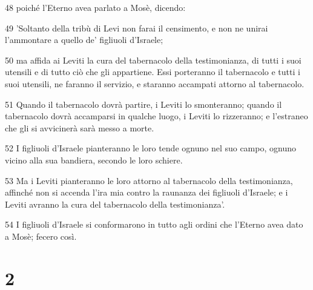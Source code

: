 \par 48 poiché l'Eterno avea parlato a Mosè, dicendo:
\par 49 'Soltanto della tribù di Levi non farai il censimento, e non ne unirai l'ammontare a quello de' figliuoli d'Israele;
\par 50 ma affida ai Leviti la cura del tabernacolo della testimonianza, di tutti i suoi utensili e di tutto ciò che gli appartiene. Essi porteranno il tabernacolo e tutti i suoi utensili, ne faranno il servizio, e staranno accampati attorno al tabernacolo.
\par 51 Quando il tabernacolo dovrà partire, i Leviti lo smonteranno; quando il tabernacolo dovrà accamparsi in qualche luogo, i Leviti lo rizzeranno; e l'estraneo che gli si avvicinerà sarà messo a morte.
\par 52 I figliuoli d'Israele pianteranno le loro tende ognuno nel suo campo, ognuno vicino alla sua bandiera, secondo le loro schiere.
\par 53 Ma i Leviti pianteranno le loro attorno al tabernacolo della testimonianza, affinché non si accenda l'ira mia contro la raunanza dei figliuoli d'Israele; e i Leviti avranno la cura del tabernacolo della testimonianza'.
\par 54 I figliuoli d'Israele si conformarono in tutto agli ordini che l'Eterno avea dato a Mosè; fecero così.

\chapter{2}

